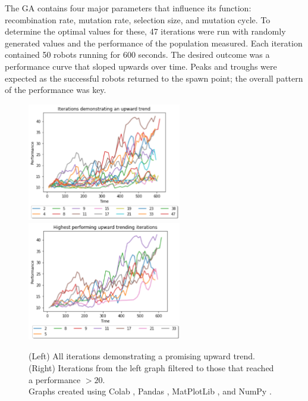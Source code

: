 \documentclass{article}
\begin{document}
The GA contains four major parameters that influence its function: recombination rate, mutation rate, selection size, and mutation cycle. To determine the optimal values for these, 47 iterations were run with randomly generated values and the performance of the population measured. Each iteration contained 50 robots running for 600 seconds.
The desired outcome was a performance curve that sloped upwards over time. Peaks and troughs were expected as the successful robots returned to the spawn point; the overall pattern of the performance was key. 
\begin{figure}[H]
\centering
\centerline{
\includegraphics[width=0.6\textwidth]{gaPatternIterations}
\includegraphics[width=0.6\textwidth]{gafilteredIterations}
}
\caption{(Left) All iterations demonstrating a promising upward trend.\\
(Right) Iterations from the left graph filtered to those that reached a performance $>20$.\\
Graphs created using Colab \citep{colab}, Pandas \citep{pd}, MatPlotLib \citep{plt}, and NumPy \citep{np}.}
\end{figure}
\end{document}
